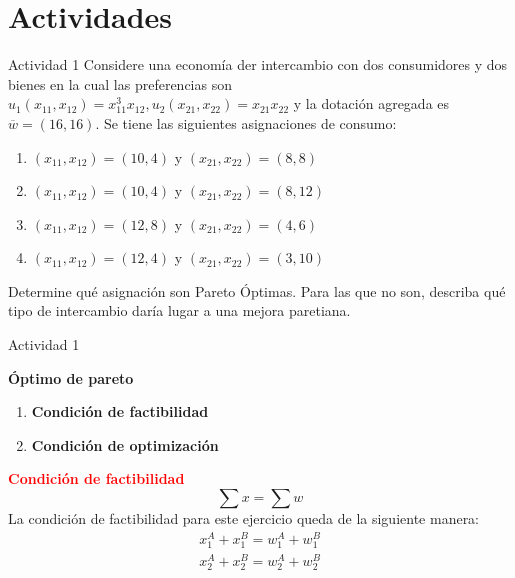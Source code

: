 \section{Actividades}
\begin{frame}{Actividad 1}
	Considere una economía der intercambio con dos consumidores y dos bienes en la cual las preferencias son $u_{1}\left( x_{11},x_{12}\right) = x_{11}^{3}x_{12}, u_{2}\left( x_{21},x_{22}\right) = x_{21}x_{22}$ y la dotación agregada es $\overline{w} = (16,16)$. Se tiene las siguientes asignaciones de consumo:
			\bigskip
		\begin{enumerate}
			\item $\left( x_{11},x_{12}\right) = (10,4)$ y $\left( x_{21},x_{22}\right) = (8,8 )$
			\item $\left( x_{11},x_{12}\right) = (10,4)$ y $\left( x_{21},x_{22}\right) = (8,12)$
			\item $\left( x_{11},x_{12}\right) = (12,8)$ y $\left( x_{21},x_{22}\right) = (4,6 )$
			\item $\left( x_{11},x_{12}\right) = (12,4)$ y $\left( x_{21},x_{22}\right) = (3,10)$
		\end{enumerate}
			\bigskip
	Determine qué asignación son Pareto Óptimas. Para las que no son, describa qué tipo de intercambio daría lugar a una mejora paretiana.
\end{frame}
\begin{frame}{Actividad 1}
	\begin{block}{\textbf{Óptimo de pareto}}
		\begin{enumerate}
			\item \textbf{Condición de factibilidad}
			\item \textbf{Condición de optimización}
		\end{enumerate}
	\end{block}
	
	\textcolor{red}{\textbf{Condición de factibilidad}}
		$$\sum x = \sum w$$
	La condición de factibilidad para este ejercicio queda de la siguiente manera:
		\begin{gather*}
			x_{1}^{A} + x_{1}^{B} = w_{1}^{A} + w_{1}^{B}\\
			x_{2}^{A} + x_{2}^{B} = w_{2}^{A} + w_{2}^{B}
		\end{gather*}
\end{frame}
